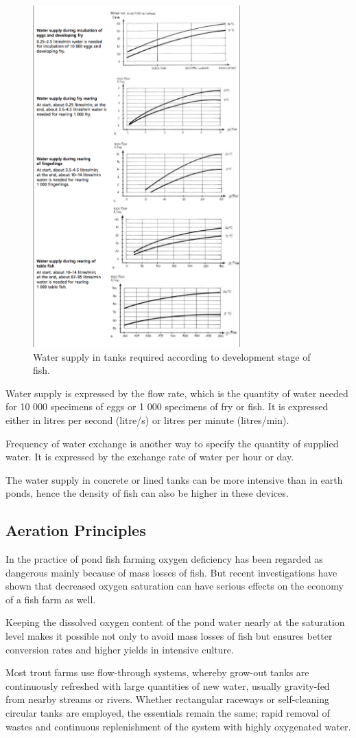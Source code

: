 \begin{figure}[H]
  \centering
   \includegraphics[width=8cm]{images/WaterSupply.png}
  \caption{ Water supply in tanks required according to development stage of fish. }
   \label{fig:WaterSupply}
\end{figure}


Water supply is expressed by the flow rate, which is the quantity of water needed for 10 000 specimens of eggs or 1 000 specimens of fry or fish. It is expressed either in litres per second (litre/s) or litres per minute (litres/min). 

Frequency of water exchange is another way to specify the quantity of supplied water. It is expressed by the exchange rate of water per hour or day.

The water supply in concrete or lined tanks can be more intensive than in earth ponds, hence the density of fish can also be higher in these devices.

\subsection{Aeration Principles}

In the practice of pond fish farming oxygen deficiency has been regarded as dangerous mainly because 
of mass losses of fish. But recent investigations have shown that decreased oxygen saturation can 
have serious effects on the economy of a fish farm as well.

Keeping the dissolved oxygen content of the pond water nearly at the saturation level makes it possible 
not only to avoid mass losses of fish but ensures better conversion rates and higher yields in intensive culture.

Most trout farms use flow-through systems, whereby grow-out tanks are continuously refreshed 
with large quantities of new water, usually gravity-fed from nearby streams or rivers. 
Whether rectangular raceways or self-cleaning circular tanks are employed, 
the essentials remain the same; rapid removal of wastes and 
continuous replenishment of the system with highly oxygenated water.
